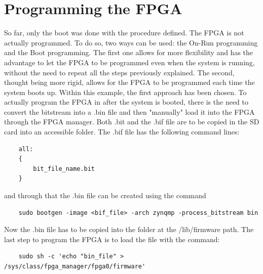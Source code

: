 \section{Programming the FPGA}
So far, only the boot was done with the procedure defined. The FPGA is not actually programmed. To do so, two ways can be used: the On-Run programming and the Boot programming. The first one allows for more flexibility and has the advantage to let the FPGA to be programmed even when the system is running, without the need to repeat all the steps previously explained. The second, thought being more rigid, allows for the FPGA to be programmed each time the system boots up. Within this example, the first approach has been chosen. To actually program the FPGA in after the system is booted, there is the need to convert the bitstream into a .bin file and then "manually" load it into the FPGA through the FPGA manager. Both .bit and the .bif file are to be copied in the SD card into an accessible folder. The .bif file has the following command lines:
\begin{verbatim}
	all:
	{
	    bit_file_name.bit
	}
\end{verbatim}
and through that the .bin file can be created using the command
\begin{verbatim}
	sudo bootgen -image <bif_file> -arch zynqmp -process_bitstream bin
\end{verbatim}
Now the .bin file has to be copied into the folder at the /lib/firmware path. The last step to program the FPGA is to load the file with the command:
\begin{verbatim}
	sudo sh -c 'echo "bin_file" > /sys/class/fpga_manager/fpga0/firmware'
\end{verbatim}





